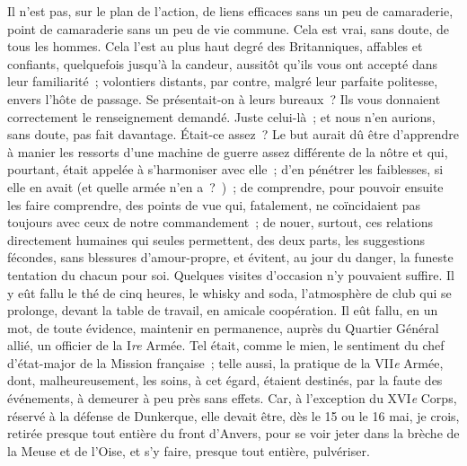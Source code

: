 \documentclass[french,twoside]{book} %
\begin{document}
Il n’est pas, sur le plan de l’action, de liens efficaces sans un peu de camaraderie, point de camaraderie sans un peu de vie commune. Cela est vrai, sans doute, de tous les hommes. Cela l’est au plus haut degré des Britanniques, affables et confiants, quelquefois jusqu’à la candeur, aussitôt qu’ils vous   ont accepté dans leur familiarité ; volontiers distants, par contre, malgré leur parfaite politesse, envers l’hôte de passage. Se présentait-on à leurs bureaux ? Ils vous donnaient correctement le renseignement demandé. Juste celui-là ; et nous n’en aurions, sans doute, pas fait davantage. Était-ce assez ? Le but aurait dû être d’apprendre à manier les ressorts d’une machine de guerre assez différente de la nôtre et qui, pourtant, était appelée à s’harmoniser avec elle ; d’en pénétrer les faiblesses, si elle en avait (et quelle armée n’en a ? ) ; de comprendre, pour pouvoir ensuite les faire comprendre, des points de vue qui, fatalement, ne coïncidaient pas toujours avec ceux de notre commandement ; de nouer, surtout, ces relations directement humaines qui seules permettent, des deux parts, les suggestions fécondes, sans blessures d’amour-propre, et évitent, au jour du danger, la funeste tentation du chacun pour soi. Quelques visites d’occasion n’y pouvaient suffire. Il y eût fallu le thé de cinq heures, le whisky and soda, l’atmosphère de club qui se prolonge, devant la table de travail, en amicale coopération. Il eût fallu, en un mot, de toute évidence, maintenir en permanence, auprès du Quartier Général allié, un officier de la I\emph{re} Armée. Tel était, comme le mien, le sentiment du chef d’état-major de la Mission française ; telle aussi, la pratique de la VII\emph{e} Armée, dont, malheureusement, les soins, à cet égard, étaient destinés, par la faute des événements, à demeurer à peu près sans effets. Car, à l’exception du XVI\emph{e} Corps, réservé à la défense de Dunkerque, elle devait être, dès le 15 ou le 16 mai, je crois, retirée presque tout entière du front d’Anvers, pour se voir jeter dans la brèche de la Meuse et de l’Oise, et s’y faire, presque tout entière, pulvériser.\par
\end{document}
